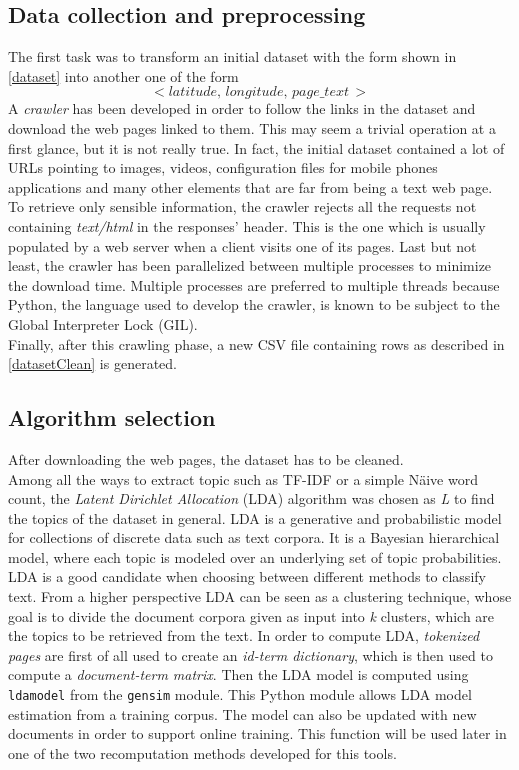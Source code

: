 \documentclass{sig-alternate-05-2015}
\begin{document}
\subsection{Data collection and preprocessing}\label{preprocessing}
The first task was to transform an initial dataset with the form shown in \ref{dataset} into another one of the form
\begin{equation}\label{datasetClean}
    <latitude,\,longitude,\,page\_text\,>
\end{equation}
A \emph{crawler} has been developed in order to follow the links in the dataset and download the web pages linked to them. This may seem a trivial operation at a first glance, but it is not really true. In fact, the initial dataset contained a lot of URLs pointing to images, videos, configuration files for mobile phones applications and many other elements that are far from being a text web page. To retrieve only sensible information, the crawler rejects all the requests not containing \emph{text/html} in the responses' header. This is the one which is usually populated by a web server when a client visits one of its pages. Last but not least, the crawler has been parallelized between multiple processes to minimize the download time. Multiple processes are preferred to multiple threads because Python, the language used to develop the crawler, is known to be subject to the Global Interpreter Lock\cite{gil} (GIL).\\
Finally, after this crawling phase, a new CSV file containing rows as described in \ref{datasetClean} is generated.
\subsection{Algorithm selection}\label{algorithmSelection}
After downloading the web pages, the dataset has to be cleaned.\\
Among all the ways to extract topic such as TF-IDF or a simple N{\"a}ive word count, the \emph{Latent Dirichlet Allocation}\cite{lda} (LDA) algorithm was chosen as \emph{L} to find the topics of the dataset in general. LDA is a generative and probabilistic model for collections of discrete data such as text corpora. It is a Bayesian hierarchical model, where each topic is modeled over an underlying set of topic probabilities. LDA is a good candidate when choosing between different methods to classify text. From a higher perspective LDA can be seen as a clustering technique, whose goal is to divide the document corpora given as input into \emph{k} clusters, which are the topics to be retrieved from the text.
In order to compute LDA, \textit{tokenized pages} are first of all used to create an \textit{id-term dictionary}, which is then used to compute a \textit{document-term matrix}. Then the LDA model is computed using \texttt{
ldamodel} from the \texttt{gensim} module. This Python module allows LDA model estimation from a training corpus. The model can also be updated with new documents in order to support online training. This function will be used later in one of the two recomputation methods developed for this tools.
\end{document}
